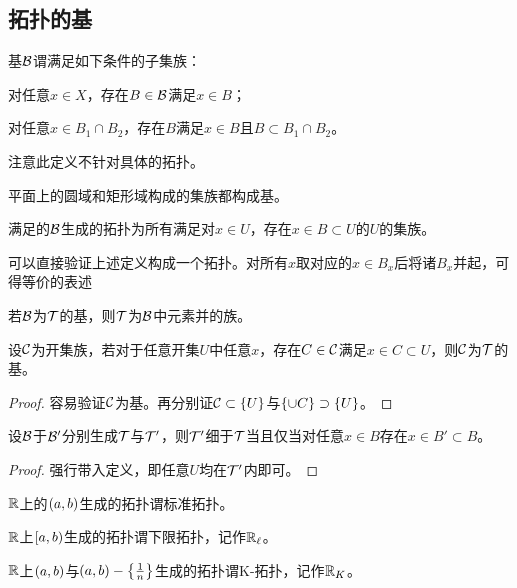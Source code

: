 \documentclass{ctexrep}
\begin{document}
  \subsection{拓扑的基}
  \begin{definition}
  \label{def:tb}
  基$\mathcal{B}$谓满足如下条件的子集族：
  \begin{cenum}
    \item 对任意$x\in X$，存在$B\in\mathcal{B}$满足$x\in B$；
    \item 对任意$x\in B_1\cap B_2$，存在$B$满足$x\in B$且$B\subset B_1\cap B_2$。
  \end{cenum}
  \end{definition}
  注意此定义不针对具体的拓扑。
  \begin{ex}
  平面上的圆域和矩形域构成的集族都构成基。
  \end{ex}
  \begin{definition}
  满足的$\mathcal{B}$生成的拓扑为所有满足对$x\in U$，存在$x\in B\subset U$的$U$的集族。
  \end{definition}
  可以直接验证上述定义构成一个拓扑。对所有$x$取对应的$x\in B_x$后将诸$B_x$并起，可得等价的表述
  \begin{theorem}
  若$\mathcal{B}$为$\mathcal{T}$的基，则$\mathcal{T}$为$\mathcal{B}$中元素并的族。
  \end{theorem}
  \begin{theorem}
  设$\mathcal{C}$为开集族，若对于任意开集$U$中任意$x$，存在$C\in\mathcal{C}$满足$x\in C\subset U$，则$\mathcal{C}$为$\mathcal{T}$的基。
  \end{theorem}
  \begin{proof}
  容易验证$\mathcal{C}$为基。再分别证$\mathcal{C}\subset \left\{U\right\}$与$\left\{\cup C\right\}\supset \left\{U\right\}$。
  \end{proof}
  \begin{theorem}
  设$\mathcal{B}$于$\mathcal{B}'$分别生成$\mathcal{T}$与$\mathcal{T}'$，则$\mathcal{T}'$细于$\mathcal{T}$当且仅当对任意$x\in B$存在$x\in B'\subset B$。
  \end{theorem}
  \begin{proof}
  强行带入定义，即任意$U$均在$\mathcal{T}'$内即可。
  \end{proof}
  \begin{definition}
  $\mathbb{R}$上的$\left(a,b\right)$生成的拓扑谓标准拓扑。
  \end{definition}
  \begin{definition}
  $\mathbb{R}$上$\left[a,b\right)$生成的拓扑谓下限拓扑，记作$\mathbb{R}_\ell$。
  \end{definition}
  \begin{definition}
  $\mathbb{R}$上$\left(a,b\right)$与$\left(a,b\right) - \left\{\frac{1}{n}\right\}$生成的拓扑谓K-拓扑，记作$\mathbb{R}_K$。
  \end{definition}
\end{document}
